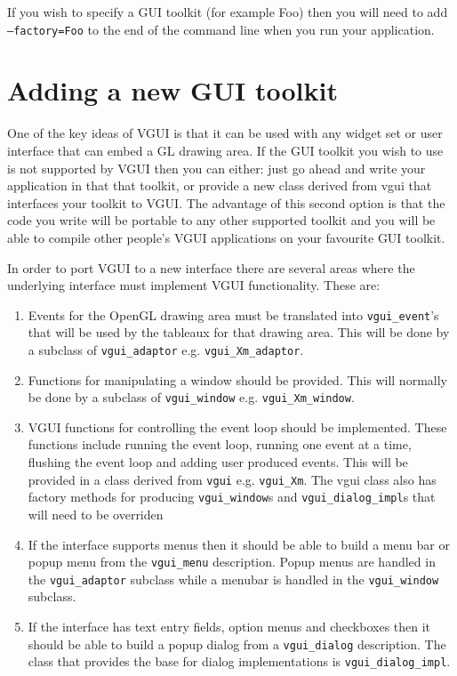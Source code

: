 \documentclass[12pt]{report} \usepackage{epsfig}
\begin{document}
If you wish to specify a GUI toolkit (for example Foo) then you will need to add
{\tt --factory=Foo} to the end of the command line when you run your application.

\section{Adding a new GUI toolkit}

One of the key ideas of VGUI is that it can be used with any widget set or
user interface that can embed a GL drawing area.  If the GUI toolkit you wish to
use is not supported by VGUI then you can either: just go ahead and write your 
application in that that toolkit, or provide a new class derived from vgui that interfaces your toolkit
to VGUI.  The advantage of this second option is that the code you write will
be portable to any other supported toolkit and you will be able to compile other people's
VGUI applications on your favourite GUI toolkit.
 
In order to port VGUI to a new interface there are several areas where the underlying interface
must implement VGUI functionality. These are:
\begin{enumerate}
\item Events for the OpenGL drawing area must be
translated into {\tt vgui\_event}'s that will be used by the tableaux for that drawing area.
This will be done by a subclass of {\tt vgui\_adaptor} e.g. {\tt vgui\_Xm\_adaptor}.
 
\item Functions for manipulating a window should be provided. This will normally be done 
by a subclass of {\tt vgui\_window} e.g.  {\tt vgui\_Xm\_window}.
 
\item VGUI functions for controlling the event loop should be implemented. These functions
include running the event loop, running one event at a time, flushing the event loop and adding
user produced events.
This will be provided in a class derived from {\tt vgui} e.g. {\tt vgui\_Xm}.
The vgui class also has factory methods for producing {\tt vgui\_window}s and 
{\tt vgui\_dialog\_impl}s that will need to be overriden
 
\item If the interface supports menus then it should be able to build a menu bar or popup 
menu from the {\tt vgui\_menu} description. Popup menus are handled in the 
{\tt vgui\_adaptor} subclass while a menubar is handled in the {\tt vgui\_window} subclass.
 
\item If the interface has text entry fields, option menus and checkboxes  then it should be
able to build a popup dialog from a {\tt vgui\_dialog} description. The class that provides 
the base for dialog implementations is {\tt vgui\_dialog\_impl}.
\end{enumerate}
\end{document}
